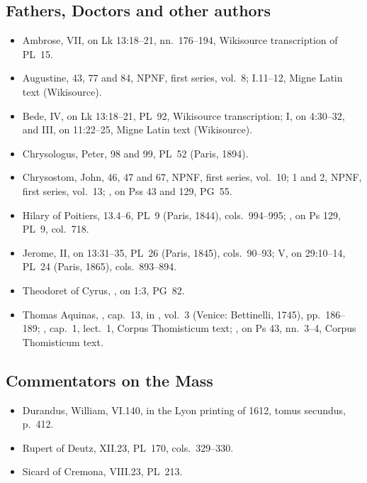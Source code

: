{\subsection*{Fathers, Doctors and other authors}
\begin{itemize}[leftmargin=1.2em,itemsep=.25em]
\item Ambrose,  VII, on Lk
13:18--21, nn.~176--194, Wikisource transcription of PL~15.
\item Augustine,  43, 77 and 84, NPNF, first
series, vol.~8;  I.11--12, Migne Latin text
(Wikisource).
\item Bede,  IV, on Lk 13:18--21, PL~92,
Wikisource transcription;  I, on
4:30--32, and III, on 11:22--25, Migne Latin text (Wikisource).
\item Chrysologus, Peter,  98 and 99, PL~52 (Paris, 1894).
\item Chrysostom, John,  46, 47 and 67, NPNF, first
series, vol.~10;  1 and 2, NPNF, first
series, vol.~13; , on Pss 43 and 129, PG~55.
\item Hilary of Poitiers,  13.4--6,
PL~9 (Paris, 1844), cols.~994--995; , on Ps 129,
PL~9, col.~718.
\item Jerome,  II, on 13:31--35, PL~26 (Paris,
1845), cols.~90--93;  V, on 29:10--14, PL~24 (Paris,
1865), cols.~893--894.
\item Theodoret of Cyrus, ,
on 1:3, PG~82.
\item Thomas Aquinas, , cap.~13, in
, vol.~3 (Venice: Bettinelli, 1745), pp.~186--189;
, cap.~1, lect.~1, Corpus
Thomisticum text; , on Ps 43, nn.~3--4, Corpus Thomisticum
text.
\end{itemize}

\subsection*{Commentators on the Mass}
\begin{itemize}[leftmargin=1.2em,itemsep=.25em]
\item Durandus, William,  VI.140, in the
Lyon printing of 1612, tomus secundus, p.~412.
\item Rupert of Deutz,  XII.23, PL~170,
cols.~329--330.
\item Sicard of Cremona,  VIII.23, PL~213.
\end{itemize}
\par}
